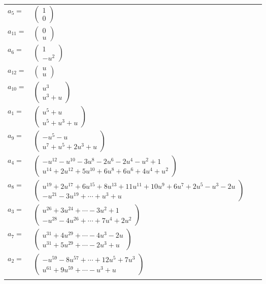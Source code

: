 \documentclass[1p]{elsarticle_modified}
\theoremstyle{definition}
\begin{document}
\begin{tabular}{m{7pt} m{180pt} m{7pt} m{180pt} }
\flushright $a_{5}=$&$\begin{pmatrix}1\\0\end{pmatrix}$ \\
\flushright $a_{11}=$&$\begin{pmatrix}0\\u\end{pmatrix}$ \\
\flushright $a_{6}=$&$\begin{pmatrix}1\\- u^2\end{pmatrix}$ \\
\flushright $a_{12}=$&$\begin{pmatrix}u\\u\end{pmatrix}$ \\
\flushright $a_{10}=$&$\begin{pmatrix}u^3\\u^3+u\end{pmatrix}$ \\
\flushright $a_{1}=$&$\begin{pmatrix}u^5+u\\u^5+u^3+u\end{pmatrix}$ \\
\flushright $a_{9}=$&$\begin{pmatrix}- u^5- u\\u^7+u^5+2 u^3+u\end{pmatrix}$ \\
\flushright $a_{4}=$&$\begin{pmatrix}- u^{12}- u^{10}-3 u^8-2 u^6-2 u^4- u^2+1\\u^{14}+2 u^{12}+5 u^{10}+6 u^8+6 u^6+4 u^4+u^2\end{pmatrix}$ \\
\flushright $a_{8}=$&$\begin{pmatrix}u^{19}+2 u^{17}+6 u^{15}+8 u^{13}+11 u^{11}+10 u^9+6 u^7+2 u^5- u^3-2 u\\- u^{21}-3 u^{19}+\cdots+u^3+u\end{pmatrix}$ \\
\flushright $a_{3}=$&$\begin{pmatrix}u^{26}+3 u^{24}+\cdots-3 u^2+1\\- u^{28}-4 u^{26}+\cdots+7 u^4+2 u^2\end{pmatrix}$ \\
\flushright $a_{7}=$&$\begin{pmatrix}u^{31}+4 u^{29}+\cdots-4 u^3-2 u\\u^{31}+5 u^{29}+\cdots-2 u^3+u\end{pmatrix}$ \\
\flushright $a_{2}=$&$\begin{pmatrix}- u^{59}-8 u^{57}+\cdots+12 u^5+7 u^3\\u^{61}+9 u^{59}+\cdots- u^3+u\end{pmatrix}$\\&\end{tabular}
\end{document}
